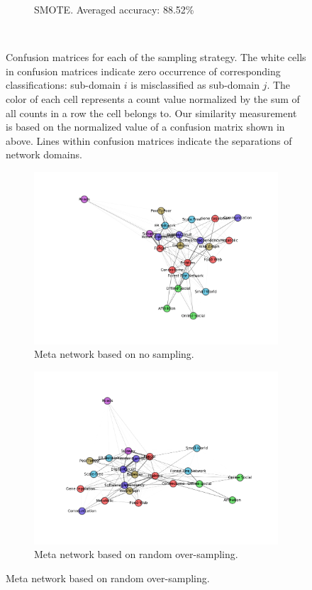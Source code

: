 \documentclass{article}
\begin{document}
\begin{figure}[H]
\begin{subfigure}{0.48\textwidth}
	\caption{SMOTE. Averaged accuracy: 88.52\%} \label{smote_confusion_sub}
	\end{subfigure}
\
\caption{Confusion matrices for each of the sampling strategy. The white cells in confusion matrices indicate zero occurrence of corresponding classifications: sub-domain $i$ is misclassified as sub-domain $j$. The color of each cell represents a count value normalized by the sum of all counts in a row the cell belongs to. Our similarity measurement is based on the normalized value of a confusion matrix shown in above. Lines within confusion matrices indicate the separations of network domains.} \label{confusion_sub}
\end{figure}

\begin{figure}[H]
	\begin{subfigure}{0.48\textwidth}
	\includegraphics[width=\linewidth]{figs/similarity/SubDomain/None/g.png}
	\caption{Meta network based on no sampling.} \label{no_graph_sub_original}
	\end{subfigure}\hspace*{\fill}
	\begin{subfigure}{0.48\textwidth}
	\includegraphics[width=\linewidth]{figs/similarity/SubDomain/RandomOver/g.png}
	\caption{Meta network based on random over-sampling.} \label{random_over_graph_sub_original}
	\end{subfigure}
	

\end{figure}
\end{document}
